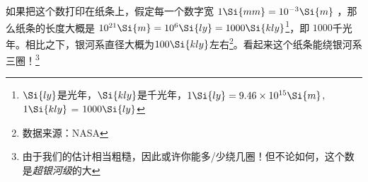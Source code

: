 如果把这个数打印在纸条上，假定每一个数字宽 $1 \Si{mm} = 10^{-3} \Si{m}$ ，那么纸条的长度大概是 $10^{21} \Si{m} = 10^6 \Si{ly} = 1000 \Si{kly}$\footnote{$\Si{ly}$是光年，$\Si{kly}$是千光年，$1 \Si{ly} = 9.46\times10^{15} \Si{m}$, $1 \Si{kly}$ = $1000 \Si{ly}$}，即 $1000$千光年。相比之下，银河系直径大概为$100 \Si{kly}$左右\footnote{数据来源：NASA}。看起来这个纸条能绕银河系三圈！\footnote{由于我们的估计相当粗糙，因此或许你能多/少绕几圈！但不论如何，这个数是\textsl{超银河级}的大}

